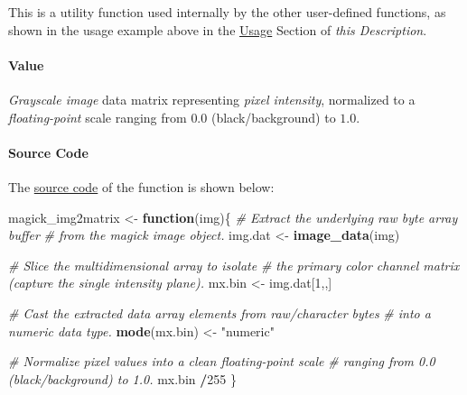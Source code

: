 \documentclass[
]{report}
\newenvironment{Shaded}{\begin{snugshade}}{\end{snugshade}}
\newcommand{\CommentTok}[1]{\textcolor[rgb]{0.56,0.35,0.01}{\textit{#1}}}
\newcommand{\ControlFlowTok}[1]{\textcolor[rgb]{0.13,0.29,0.53}{\textbf{#1}}}
\newcommand{\DecValTok}[1]{\textcolor[rgb]{0.00,0.00,0.81}{#1}}
\newcommand{\FunctionTok}[1]{\textcolor[rgb]{0.13,0.29,0.53}{\textbf{#1}}}
\newcommand{\NormalTok}[1]{#1}
\newcommand{\OtherTok}[1]{\textcolor[rgb]{0.56,0.35,0.01}{#1}}
\newcommand{\SpecialCharTok}[1]{\textcolor[rgb]{0.81,0.36,0.00}{\textbf{#1}}}
\newcommand{\StringTok}[1]{\textcolor[rgb]{0.31,0.60,0.02}{#1}}
\begin{document}
\begin{noteblock}
This is a utility function used internally by the other user-defined functions, as shown in the usage example above in the \hyperref[func.magick_img2matrix.usage]{Usage} Section of \emph{this Description}.

\end{noteblock}

\protect{}\label{func.magick_img2matrix.value}
\paragraph{Value}\label{value-3}

\hfill\break

\emph{Grayscale image} data matrix representing \emph{pixel intensity}, normalized to a \emph{floating-point} scale ranging from \(0.0\) (black/background) to \(1.0\).

\protect{}\label{func.magick_img2matrix.code}
\paragraph{Source Code}\label{source-code-4}

\hfill\break

The \href{https://github.com/AzKurban-edX-DS/edx.capstone.choose-your-own/blob/main/r/support-functions/data-helper.R\#L485}{source code} of the function is shown below:

\begin{Shaded}
\begin{Highlighting}[]
\NormalTok{magick\_img2matrix }\OtherTok{\textless{}{-}} \ControlFlowTok{function}\NormalTok{(img)\{}
  \CommentTok{\#\textquotesingle{} Extract the underlying raw byte array buffer }
  \CommentTok{\#\textquotesingle{} from the \textasciigrave{}magick\textasciigrave{} image object.}
\NormalTok{  img.dat }\OtherTok{\textless{}{-}} \FunctionTok{image\_data}\NormalTok{(img)}
  
  \CommentTok{\#\textquotesingle{} Slice the multidimensional array to isolate }
  \CommentTok{\#\textquotesingle{} the primary color channel matrix (capture the single intensity plane).}
\NormalTok{  mx.bin }\OtherTok{\textless{}{-}}\NormalTok{ img.dat[}\DecValTok{1}\NormalTok{,,]}
  
  \CommentTok{\#\textquotesingle{} Cast the extracted data array elements from raw/character bytes }
  \CommentTok{\#\textquotesingle{} into a numeric data type.}
  \FunctionTok{mode}\NormalTok{(mx.bin) }\OtherTok{\textless{}{-}} \StringTok{"numeric"}
  
  \CommentTok{\#\textquotesingle{} Normalize pixel values into a clean floating{-}point scale }
  \CommentTok{\#\textquotesingle{} ranging from 0.0 (black/background) to 1.0. }
\NormalTok{  mx.bin }\SpecialCharTok{/}\DecValTok{255}
\NormalTok{\}}
\end{Highlighting}
\end{Shaded}
\end{document}
